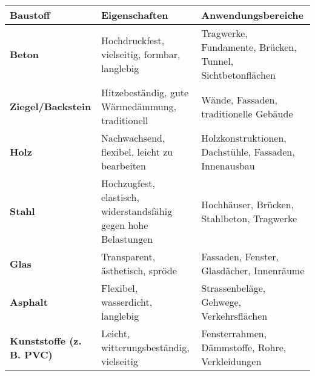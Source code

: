 \documentclass[
11pt,
captions=tableheading,
smallheadings,
headsepline,
footsepline, 
captions=tableheading,
parskip=half-,
]{scrartcl}
\begin{document}
\begin{table}[h!]
    \centering
    \begin{tabular}{p{3.5cm}p{4cm}p{7cm}}
        \toprule
        \textbf{Baustoff}                                               & \textbf{Eigenschaften} & \textbf{Anwendungsbereiche} \\
        \midrule
        \textbf{Beton}                                                  &
        Hochdruckfest, vielseitig, formbar, langlebig                   &
        Tragwerke, Fundamente, Brücken, Tunnel, Sichtbetonflächen                                                              \\
        \midrule
        \textbf{Ziegel/Backstein}                                       &
        Hitzebeständig, gute Wärmedämmung, traditionell                 &
        Wände, Fassaden, traditionelle Gebäude                                                                                 \\
        \midrule
        \textbf{Holz}                                                   &
        Nachwachsend, flexibel, leicht zu bearbeiten                    &
        Holzkonstruktionen, Dachstühle, Fassaden, Innenausbau                                                                  \\
        \midrule
        \textbf{Stahl}                                                  &
        Hochzugfest, elastisch, widerstandsfähig gegen hohe Belastungen &
        Hochhäuser, Brücken, Stahlbeton, Tragwerke                                                                             \\
        \midrule
        \textbf{Glas}                                                   &
        Transparent, ästhetisch, spröde                                 &
        Fassaden, Fenster, Glasdächer, Innenräume                                                                              \\
        \midrule
        \textbf{Asphalt}                                                &
        Flexibel, wasserdicht, langlebig                                &
        Strassenbeläge, Gehwege, Verkehrsflächen                                                                               \\
        \midrule
        \textbf{Kunststoffe (z. B. PVC)}                                &
        Leicht, witterungsbeständig, vielseitig                         &
        Fensterrahmen, Dämmstoffe, Rohre, Verkleidungen                                                                        \\

\end{tabular}
\end{table}
\end{document}
